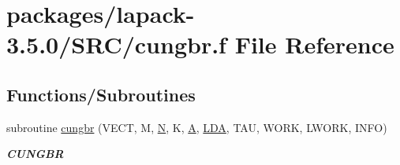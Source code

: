 \hypertarget{cungbr_8f}{}\section{packages/lapack-\/3.5.0/\+S\+R\+C/cungbr.f File Reference}
\label{cungbr_8f}
\subsection*{Functions/\+Subroutines}
\begin{DoxyCompactItemize}
\item 
subroutine \hyperlink{group__complexGBcomputational_gadd5ca7f13d941048e29faab28e3850ea}{cungbr} (V\+E\+C\+T, M, \hyperlink{polmisc_8c_a0240ac851181b84ac374872dc5434ee4}{N}, K, \hyperlink{classA}{A}, \hyperlink{example__user_8c_ae946da542ce0db94dced19b2ecefd1aa}{L\+D\+A}, T\+A\+U, W\+O\+R\+K, L\+W\+O\+R\+K, I\+N\+F\+O)
\begin{DoxyCompactList}\small\item\em {\bfseries C\+U\+N\+G\+B\+R} \end{DoxyCompactList}\end{DoxyCompactItemize}
